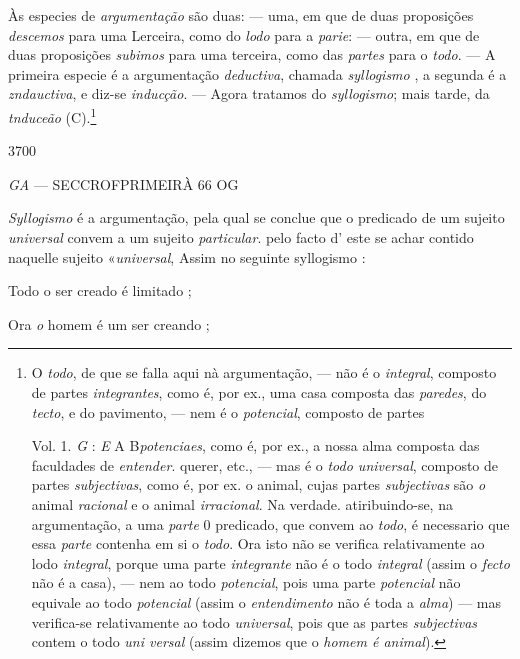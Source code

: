 
Às especies de \emph{argumentação} são duas: --- uma, em que de duas proposições \emph{descemos} para uma Lerceira, como do \emph{lodo} para a \emph{parie}: --- outra, em que de duas proposições \emph{subimos} para uma terceira, como das \emph{partes} para o \emph{todo}. --- A primeira especie é a argumentação \emph{deductiva}, chamada \emph{syllogismo} , a segunda é a \emph{zndauctiva}, e diz-se \emph{inducção}. --- Agora tratamos do \emph{syllogismo}; mais tarde, da \emph{tnduceão} (C).\footnote{O \emph{todo}, de que se falla aqui nà argumentação, --- não é o \emph{integral}, composto de partes \emph{integrantes}, como é, por ex., uma casa composta das \emph{paredes}, do \emph{tecto}, e do pavimento, --- nem é o \emph{potencial}, composto de partes\par Vol. 1. \emph{G} : \emph{E} A \textbar{} B\emph{potenciaes}, como é, por ex., a nossa alma composta das faculdades de \emph{entender}. querer, etc., --- mas é o \emph{todo universal}, composto de partes \emph{subjectivas}, como é, por ex. o animal, cujas partes \emph{subjectivas} são \emph{o} animal \emph{racional} e o animal \emph{irracional}. Na verdade. atiribuindo-se, na argumentação, a uma \emph{parte} 0 predicado, que convem ao \emph{todo}, é necessario que essa \emph{parte} contenha em si o \emph{todo}. Ora isto não se verifica relativamente ao lodo \emph{integral}, porque uma parte \emph{integrante} não é o todo \emph{integral} (assim o \emph{fecto} não é a casa), --- nem ao todo \emph{potencial}, pois uma parte \emph{potencial} não equivale ao todo \emph{potencial} (assim o \emph{entendimento} não é toda a \emph{alma}) --- mas verifica-se relativamente ao todo \emph{universal}, pois que as partes \emph{subjectivas} contem o todo \emph{uni versal} (assim dizemos que o \emph{homem é animal}).}

3700

\emph{GA} --- SECCROFPRIMEIRÀ 66 \textbar{} OG


 
\emph{Syllogismo} é a argumentação, pela qual se conclue que o predicado de um sujeito \emph{universal} convem a um sujeito \emph{particular}. pelo facto d' este se achar contido naquelle sujeito «\emph{universal}, Assim no seguinte syllogismo :

Todo o ser creado é limitado ;

Ora \emph{o} homem é um ser creando ;

